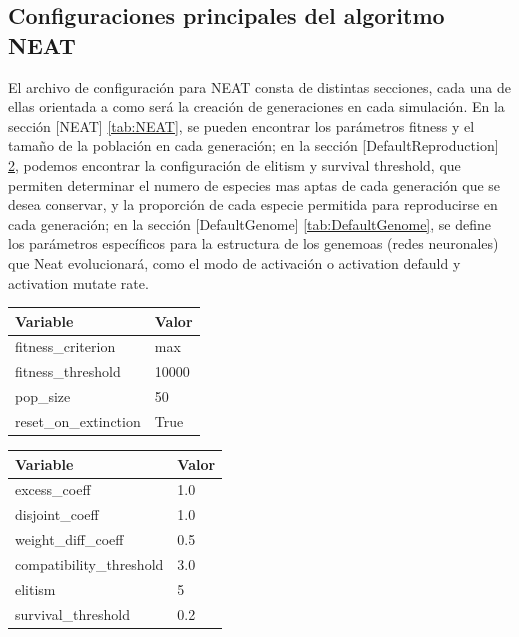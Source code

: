 \documentclass[conference]{IEEEtran}
\begin{document}
\subsection{Configuraciones principales del algoritmo NEAT}
El archivo de configuración para NEAT consta de distintas secciones, cada una de ellas orientada a como será la creación de generaciones en cada simulación. En la sección [NEAT] \ref{tab:NEAT}, se pueden encontrar los parámetros fitness y el tamaño de la población en cada generación; en la sección [DefaultReproduction] \ref{tab:DefaultReproduction}, podemos encontrar la configuración de elitism y survival threshold, que permiten determinar el numero de especies mas aptas de cada generación que se desea conservar, y la proporción de cada especie permitida para reproducirse en cada generación; en la sección [DefaultGenome] \ref{tab:DefaultGenome}, se define los parámetros específicos para la estructura de los genemoas (redes neuronales) que Neat evolucionará, como el modo de activación o activation defauld y activation mutate rate.
\begin{table}
    \centering
    \label{tab:NEAT}
    \begin{tabular}{ll}
    \toprule
    \textbf{Variable} & \textbf{Valor} \\
    \midrule
    fitness\_criterion     & max \\
    fitness\_threshold     & 10000 \\
    pop\_size              & 50 \\
    reset\_on\_extinction  & True  \\
    \bottomrule
    \end{tabular}
    \vspace{0.5cm}
    
    \label{tab:DefaultReproduction}
    \begin{tabular}{ll}
    \toprule
    \textbf{Variable} & \textbf{Valor} \\
    \midrule
    excess\_coeff            & 1.0 \\
    disjoint\_coeff          & 1.0 \\
    weight\_diff\_coeff      & 0.5 \\
    compatibility\_threshold & 3.0 \\
    elitism                  & 5 \\
    survival\_threshold      & 0.2 \\
    \bottomrule
    \end{tabular}
    \vspace{0.5cm}
\end{table}
\end{document}
